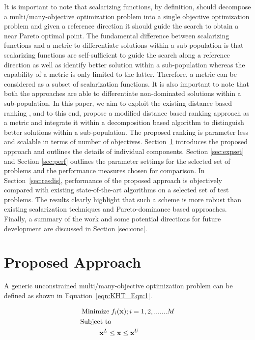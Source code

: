 \documentclass{sig-alternate}
\begin{document}
It is important to note that scalarizing functions, by definition, should decompose a multi/many-objective optimization problem into a single objective optimization problem and given a reference direction it should guide the search to obtain a near Pareto optimal point. The fundamental difference between scalarizing functions and a metric to differentiate solutions within a sub-population is that scalarizing functions are self-sufficient to guide the search along a reference direction as well as identify better solution within a sub-population whereas the capability of a metric is only limited to the latter. Therefore, a metric can be considered as a subset of scalarization functions. It is also important to note that both the approaches are able to differentiate non-dominated solutions within a sub-population. In this paper, we aim to exploit the existing distance based ranking \cite{mostaghim2008}, and to this end, propose a modified distance based ranking approach as a metric and integrate it within a decomposition based algorithm to distinguish better solutions within a sub-population. The proposed ranking is parameter less and scalable in terms of number of objectives. Section~\ref{sec:proapp} introduces the proposed approach and outlines the details of individual components. Section \ref{sec:expset} and Section \ref{sec:perf} outlines the parameter settings for the selected set of problems and the performance measures chosen for comparison. In Section~\ref{sec:resdis}, performance of the proposed approach is objectively compared with existing state-of-the-art algorithms on a selected set of test problems. The results clearly highlight that such a scheme is more robust than existing scalarization techniques and Pareto-dominance based approaches. Finally, a summary of the work and some potential directions for future development are discussed in Section \ref{sec:conc}.


\section{Proposed Approach}
\label{sec:proapp}

\label{sec:KHT_sec:2}
A generic unconstrained multi/many-objective optimization problem can be defined as shown in Equation~\ref{eqn:KHT_Eqn:1}.

\begin{equation}
\begin{aligned}
\operatorname{Minimize}\; & f_i(\textbf{x}); i=1,2,.......M \\
\text{Subject to} & \\ 
& \hspace{-0.6cm}\textbf{x}^{L}\le\textbf{x}\le\textbf{x}^{U}\\ 
\label{eqn:KHT_Eqn:1}
\end{aligned}
\end{equation}
\end{document}
